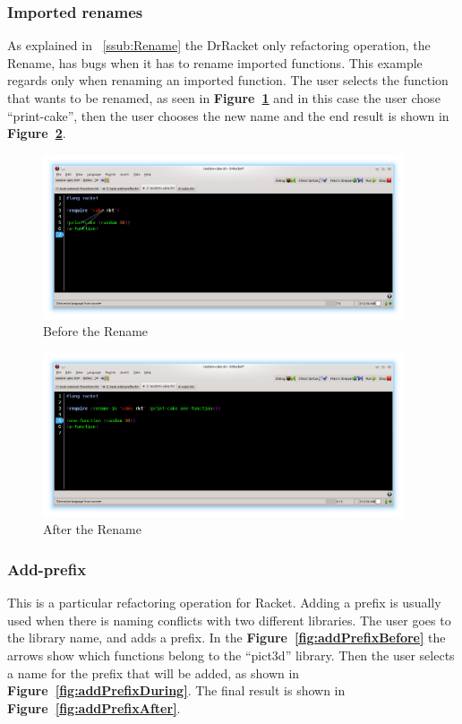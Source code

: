 \subsubsection{Imported renames}
As explained in ~\ref{ssub:Rename} the DrRacket only refactoring operation, the Rename, has bugs when it has to rename imported functions.
This example regards only when renaming an imported function. 
The user selects the function that wants to be renamed, as seen in {\bf Figure~\ref{fig:renameBefore}} and in this case the user chose ``print-cake'', then the user chooses the new name and the end result is shown in {\bf Figure~\ref{fig:renameAfter}}.
\begin{figure}[htbp]
	\centering
	\includegraphics[width=0.95\textwidth]{img/rename1.png}
	\caption{Before the Rename}
	\label{fig:renameBefore}
\end{figure}

\begin{figure}[htbp]
	\centering
	\includegraphics[width=0.95\textwidth]{img/rename2.png}
	\caption{After the Rename}
	\label{fig:renameAfter}
\end{figure}

\subsubsection{Add-prefix}

This is a particular refactoring operation for Racket. Adding a prefix is usually used when there is naming conflicts with two different libraries. The user goes to the library name, and adds a prefix.
In the {\bf Figure~\ref{fig:addPrefixBefore}} the arrows show which functions belong to the ``pict3d'' library.
Then the user selects a name for the prefix that will be added, as shown in {\bf Figure~\ref{fig:addPrefixDuring}}. The final result is shown in {\bf Figure~\ref{fig:addPrefixAfter}}.

